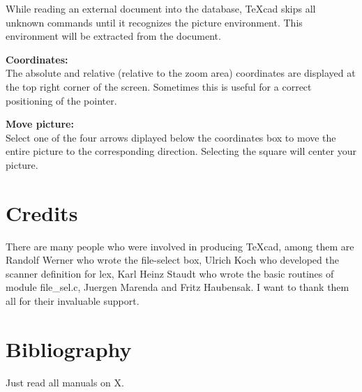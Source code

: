 \begin{description}
     While reading an external document into the database,
     TeXcad skips all unknown commands until it recognizes the
     picture environment. This environment will be extracted
     from the document.

  \item{\bf Coordinates: } \\
     The absolute and relative (relative to the zoom area) coordinates
     are displayed at the top right corner of the screen.
     Sometimes this is useful for a correct positioning of the
     pointer.

  \item{\bf Move picture: } \\
     Select one of the four arrows diplayed below the coordinates box to move the
     entire picture to the corresponding direction. Selecting the square will center
     your picture.
     
\end{description}

\section{Credits}

	There are many people who were involved in producing TeXcad, among them are Randolf Werner who wrote the file-select box, 
	Ulrich Koch who developed  the scanner definition for lex, Karl Heinz Staudt who wrote the basic routines of module file\_sel.c, Juergen Marenda
	and Fritz Haubensak. I want to thank them all for their invaluable support.
	
\section{Bibliography}

	Just read all manuals on X.
	
	


 
